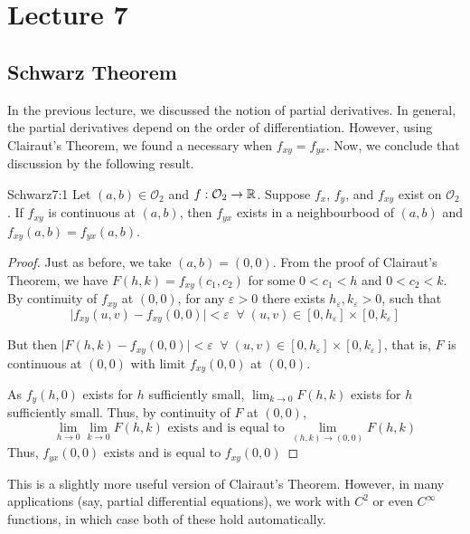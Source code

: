 \documentclass[../Analysis-3.tex]{subfiles}
\begin{document}
\chapter*{Lecture 7} %
\setcounter{chapter}{7} %
\setcounter{section}{0}
\setcounter{equation}{0}
\setcounter{figure}{0}


\section{Schwarz Theorem}

In the previous lecture, we discussed the notion of partial derivatives. In general, the partial derivatives depend on the order of differentiation. However, using Clairaut's Theorem, we found a necessary when $f_{xy} = f_{yx}$. Now, we conclude that discussion by the following result.

\begin{Thm}{Schwarz}{7:1}
  Let $(a,b) \in \mathcal{O}_2$ and $f:\mathcal{O}_2 \to \mathbb{R}$. Suppose $f_x$, $f_y$, and $f_{xy}$ exist on $\mathcal{O}_2$. If $f_{xy}$ is continuous at $(a,b)$, then $f_{yx}$ exists in a neighbourbood of $(a,b)$ and $f_{xy}(a,b) = f_{yx}(a,b)$.
\end{Thm}

\begin{proof}
  Just as before, we take $(a,b) = (0,0)$. From the proof of Clairaut's Theorem, we have $F(h,k) = f_{xy}(c_1, c_2)$ for some $0 < c_1< h$ and $0 < c_2 < k$. By continuity of $f_{xy}$ at $(0,0)$, for any $\varepsilon >0$ there exists $h_\varepsilon, k_\varepsilon > 0$, such that
  \[
    \mid f_{xy}(u,v)- f_{xy}(0,0)\mid < \varepsilon \;\;\forall \; (u,v) \in [0,h_\varepsilon]\times[0,k_\varepsilon]
  \]
  
  But then $\mid F(h,k) - f_{xy}(0,0) \mid < \varepsilon \;\;\forall \; (u,v) \in [0,h_\varepsilon]\times[0,k_\varepsilon]$, that is, $F$ is continuous at $(0,0)$ with limit $f_{xy}(0,0)$ at $(0,0)$.

  As $f_y(h,0)$ exists for $h$ sufficiently small, $\lim_{k \to 0} F(h,k)$ exists for $h$ sufficiently small. Thus, by continuity of $F$ at $(0,0)$,
  \[\lim_{h \to 0}\lim_{k \to 0} F(h,k) \text{  exists and is equal to  }\lim_{(h,k) \to (0,0)} F(h,k)\]
  Thus, $f_{yx}(0,0)$ exists and is equal to $f_{xy}(0,0)$
\end{proof}

\msk

This is a slightly more useful version of Clairaut's Theorem. However, in many applications (say, partial differential equations), we work with $C^2$ or even $C^\infty$ functions, in which case both of these hold automatically.
\end{document}
